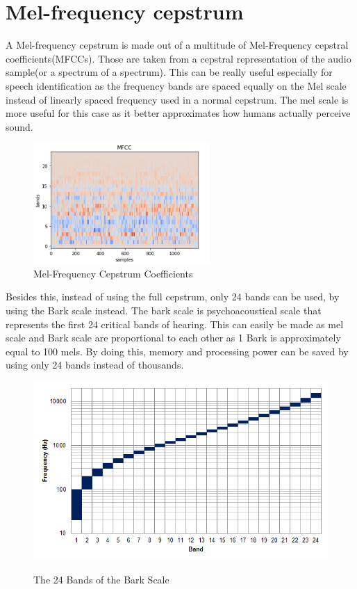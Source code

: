\section{Mel-frequency cepstrum}
A Mel-frequency cepstrum is made out of a multitude of Mel-Frequency cepstral coefficients(MFCCs). 
Those are taken from a cepstral representation of the audio sample(or a spectrum of a spectrum).
This can be really useful especially for speech identification as the frequency bands are spaced 
equally on the Mel scale instead of linearly spaced frequency used in a normal cepstrum. 
The mel scale is more useful for this case as it better approximates how humans actually perceive sound.
\cite{MFCC}

\begin{figure}[htp]
	\centering
	\includegraphics[width = 0.6\textwidth]{Illustrations/mfcc.png}
	\caption{Mel-Frequency Cepstrum Coefficients}
	\label{fig:mfcc}
\end{figure}

\newpage
Besides this, instead of using the full cepstrum, only 24 bands can be used, 
by using the Bark scale instead.
The bark scale is psychoacoustical scale that represents the first 24 critical bands of hearing.
This can easily be made as mel scale and Bark scale are proportional to each other as 1 Bark 
is approximately equal to 100 mels.
By doing this, memory and processing power can be saved by using only 24 bands instead of thousands.
\cite{BARKSCALE}
\begin{figure}[htp]
	\centering
	\includegraphics[width=1\textwidth]{Illustrations/Bark_scale.png}
	\caption{The 24 Bands of the Bark Scale}\cite{BARKSCALEPHTOT}
	\label{fig:BarkScale}
\end{figure}